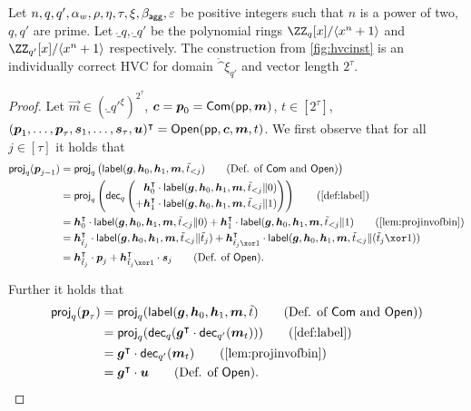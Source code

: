 \begin{lemma}\label{lem:veccomcorrectness}
  Let $n,q,q',\alpha_w,\rho,\eta,\tau,\xi,\beta_{\mathsf{agg}},\varepsilon$ be positive integers such that $n$ is a power of two, $q,q'$ are prime.
  Let $\ring_q,\ring_{q'}$ be the polynomial rings $\ZZ_q[x]/\langle x^n+1\rangle$ and $\ZZ_{q'}[x]/\langle x^n+1\rangle$ respectively.
  The construction from \autoref{fig:hvcinst} is an individually correct HVC for domain $\ring^\xi_{q'}$ and vector length $2^\tau$.
\end{lemma}
\begin{proof}
Let $\vec{m} \in (\ring_{q'}^{\xi})^{2^\tau}$, $\boldsymbol{c} = \boldsymbol{p}_0 = \mathsf{Com}(\mathsf{pp},\boldsymbol{m})$, $t\in[2^\tau]$, $(\boldsymbol{p}_1,\dots,\boldsymbol{p}_{\tau},\boldsymbol{s}_1, \dots, \boldsymbol{s}_{\tau},\boldsymbol{u})^\intercal = \mathsf{Open}(\mathsf{pp},\boldsymbol{c},\boldsymbol{m},t)$.
We first observe that for all $j\in[\tau]$ it holds that
\begin{align*}
  \proj_q(\vec{p}_{j-1})
  ={}&\proj_q\left(\lbl(\vec{g},\vec{h}_0,\vec{h}_1,\vec{m},\tilde t_{< j})\tag{Def. of $\commit$ and $\open$}\right)\\
  ={}&\proj_q\left(\decomp_q\left(\begin{aligned}
  &\vec{h}_0^\intercal \cdot\lbl(\vec{g},\vec{h}_0,\vec{h}_1,\vec{m},\tilde t_{< j}\Vert 0)\\ +& \vec{h}_1^\intercal \cdot\lbl(\vec{g},\vec{h}_0,\vec{h}_1,\vec{m},\tilde t_{< j}\Vert 1)
  \end{aligned}\right)\right)\tag{\autoref{def:label}}\\
  ={}&\vec{h}_0^\intercal \cdot\lbl(\vec{g},\vec{h}_0,\vec{h}_1,\vec{m},\tilde t_{< j}\Vert 0) + \vec{h}_1^\intercal \cdot\lbl(\vec{g},\vec{h}_0,\vec{h}_1,\vec{m},\tilde t_{< j}\Vert 1)\tag{\autoref{lem:projinvofbin}}\\
  ={}&\vec{h}_{\tilde t_{j}}^\intercal \cdot\lbl(\vec{g},\vec{h}_0,\vec{h}_1,\vec{m},\tilde t_{< j}\Vert \tilde t_{j}) + \vec{h}_{\tilde t_{j}\xor 1}^\intercal \cdot\lbl(\vec{g},\vec{h}_0,\vec{h}_1,\vec{m},\tilde t_{< j}\Vert (\tilde t_{j}\xor 1))\\
  ={}&\vec{h}_{\tilde t_{j}}^\intercal \cdot\vec{p}_{j} + \vec{h}_{\tilde t_{j}\xor 1}^\intercal \cdot\vec{s}_{j}\tag{Def. of $\open$}.
\end{align*}

Further it holds that
\begin{align*}
  \proj_q(\vec{p}_{\tau})
  ={}&\proj_q(\lbl(\vec{g},\vec{h}_0,\vec{h}_1,\vec{m},\tilde t)\tag{Def. of $\commit$ and $\open$})\\
  ={}&\proj_q(\decomp_q(\vec{g}^\intercal\cdot \decomp_{q'}(\vec{m}_t)))\tag{\autoref{def:label}}\\
  ={}&\vec{g}^\intercal\cdot \decomp_{q'}(\vec{m}_t)\tag{\autoref{lem:projinvofbin}}\\
  ={}&\vec{g}^\intercal\cdot\vec{u}\tag{Def. of $\open$}.
\end{align*}



\end{proof}
